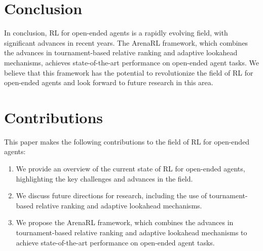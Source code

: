 \documentclass[12pt]{article}
\begin{document}
\section{Conclusion}

In conclusion, RL for open-ended agents is a rapidly evolving field, with significant advances in recent years. The ArenaRL framework, which combines the advances in tournament-based relative ranking and adaptive lookahead mechanisms, achieves state-of-the-art performance on open-ended agent tasks. We believe that this framework has the potential to revolutionize the field of RL for open-ended agents and look forward to future research in this area.

\section{Contributions}

This paper makes the following contributions to the field of RL for open-ended agents:

\begin{enumerate}
    \item We provide an overview of the current state of RL for open-ended agents, highlighting the key challenges and advances in the field.
    \item We discuss future directions for research, including the use of tournament-based relative ranking and adaptive lookahead mechanisms.
    \item We propose the ArenaRL framework, which combines the advances in tournament-based relative ranking and adaptive lookahead mechanisms to achieve state-of-the-art performance on open-ended agent tasks.
\end{enumerate}
\end{document}
